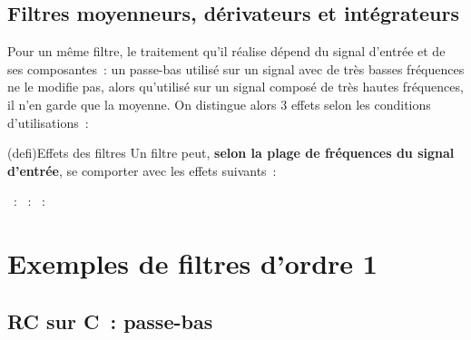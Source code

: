 \documentclass[../../main/main.tex]{subfiles}
\begin{document}
\subsection{Filtres moyenneurs, dérivateurs et intégrateurs}
Pour un même filtre, le traitement qu'il réalise dépend du signal d'entrée et de
ses composantes~: un passe-bas utilisé sur un signal avec de très basses
fréquences ne le modifie pas, alors qu'utilisé sur un signal composé de très hautes
fréquences, il n'en garde que la moyenne. On distingue alors 3 effets selon les
conditions d'utilisations~:
\begin{tcb*}(defi){Effets des filtres}
	Un filtre peut, \textbf{selon la plage de fréquences du signal d'entrée}, se
	comporter avec les effets suivants~:
	\begin{itemize}
		~:
		~:
		~:
	\end{itemize}
\end{tcb*}

\section{Exemples de filtres d'ordre 1}
\subsection{RC sur C~: passe-bas}
\end{document}
